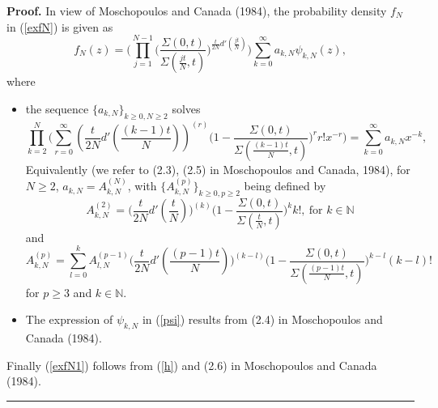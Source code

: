 \documentclass[6pt]{article}
\newenvironment{proof}[1][Proof]{\noindent\textbf{#1.} }{\ \rule{0.5em}{0.5em}}
\numberwithin{equation}{section}
\begin{document}
 \begin{proof} In view of Moschopoulos and Canada (1984), the probability density $f_N$ in (\ref{exfN}) is given as
\begin{equation}
\label{df}
f_N(z)=\Big(\prod_{j=1}^{N-1}\Big(\frac{\Sigma(0,t)}{\Sigma(\frac{jt}{N},t)}\Big)^{\frac{t}{2N}d'(\frac{jt}{N})}\Big)\sum_{k=0}^{\infty}a_{k,N}\psi_{k,N}(z),
\end{equation}
where
\begin{itemize}
\item the sequence $\{a_{k,N}\}_{k\ge0,N\ge2}$ solves
$$
\prod_{k=2}^{N}\Big(\sum_{r=0}^{\infty}(\frac{t}{2N}d'(\frac{(k-1)t}{N}))^{(r)}\big(1-\frac{\Sigma(0,t)}{\Sigma(\frac{(k-1)t}{N},t)}\big)^{r}r!x^{-r}\Big)=\sum_{k=0}^{\infty}a_{k,N}x^{-k},
$$
Equivalently (we refer to (2.3), (2.5) in Moschopoulos and Canada, 1984), for $N\ge 2$,
$a_{k,N}=A_{k,N}^{(N)}$, with $\{A_{k,N}^{(p)}\}_{k\ge0,p\ge2}$ being defined by
$$
A_{k,N}^{(2)}=\Big(\frac{t}{2N}d'(\frac{t}{N})\Big)^{(k)}\Big(1-\frac{\Sigma(0,t)}{\Sigma(\frac{t}{N},t)}\Big)^kk!,~\mbox{for $k\in\mathbb N$}
$$
and
$$
A_{k,N}^{(p)}=\sum\limits_{l=0}^kA_{l,N}^{(p-1)}\Big(\frac{t}{2N}d'(\frac{(p-1)t}{N})\Big)^{(k-l)}\Big(1-\frac{\Sigma(0,t)}{\Sigma(\frac{(p-1)t}{N},t)}\Big)^{k-l}(k-l)!
$$
for $p\ge3$ and $k\in\mathbb N$.
\item The expression of $\psi_{k,N}$ in (\ref{psi}) results from (2.4) in Moschopoulos and Canada (1984).
\end{itemize}
Finally (\ref{exfN1}) follows from (\ref{h}) and (2.6) in Moschopoulos and Canada (1984).
\end{proof}
\end{document}
